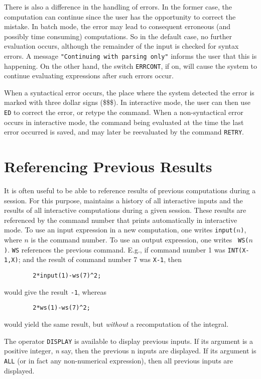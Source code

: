 There is also a difference in the handling of errors.  In the former case,
the computation can continue since the user has the opportunity to correct
the mistake.  In batch mode, the error may lead to consequent erroneous
(and possibly time consuming) computations.  So in the default case, no
further evaluation occurs, although the remainder of the input is checked
for syntax errors.  A message {\tt "Continuing with parsing only"}
informs the user that this is happening.  On the other hand, the switch
{\tt ERRCONT},  if on, will cause the system to continue
evaluating expressions after such errors occur.

When a syntactical error occurs, the place where the system detected the
error is marked with three dollar signs (\$\$\$). In interactive mode, the
user can then use {\tt ED}  to correct the error, or retype the
command.  When a non-syntactical error occurs in interactive mode, the
command being evaluated at the time the last error occurred is saved, and
may later be reevaluated by the command {\tt RETRY}. 

\section{Referencing Previous Results}

It is often useful to be able to reference results of previous
computations during a {\REDUCE} session.  For this purpose, {\REDUCE}
maintains a history  of all interactive inputs and the
results of all interactive computations during a given session.  These
results are referenced by the command number that {\REDUCE} prints
automatically in interactive mode.  To use an input expression in a new
computation, one writes {\tt input(}$n${\tt )},  where
$n$ is the command number.  To use an output expression, one writes {\tt
WS(}$n${\tt )}.  {\tt WS} references the previous command.
E.g., if command number 1 was {\tt INT(X-1,X)}; and the result of command
number 7 was {\tt X-1}, then
\begin{verbatim}
        2*input(1)-ws(7)^2;
\end{verbatim}
would give the result {\tt -1}, whereas
\begin{verbatim}
        2*ws(1)-ws(7)^2;
\end{verbatim}
would yield the same result, but {\em without} a recomputation of the
integral.

The operator {\tt DISPLAY}  is available to display previous
inputs.  If its argument is a positive integer, {\it n} say, then the
previous n inputs are displayed.  If its argument is {\tt ALL} (or in fact
any non-numerical expression), then all previous inputs are displayed.

